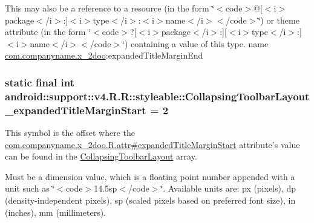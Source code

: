 This may also be a reference to a resource (in the form \char`\"{}$<$code$>$@\mbox{[}$<$i$>$package$<$/i$>$:\mbox{]}$<$i$>$type$<$/i$>$:$<$i$>$name$<$/i$>$$<$/code$>$\char`\"{}) or theme attribute (in the form \char`\"{}$<$code$>$?\mbox{[}$<$i$>$package$<$/i$>$:\mbox{]}\mbox{[}$<$i$>$type$<$/i$>$:\mbox{]}$<$i$>$name$<$/i$>$$<$/code$>$\char`\"{}) containing a value of this type.  name \hyperlink{namespacecom_1_1companyname_1_1x__2doo}{com.companyname.x\_\-2doo}:expandedTitleMarginEnd \hypertarget{classandroid_1_1support_1_1v4_1_1_r_1_1styleable_84d535c1e152dbfcb33c3dda89373800}{
\subsubsection[{CollapsingToolbarLayout\_\-expandedTitleMarginStart}]{\setlength{\rightskip}{0pt plus 5cm}static final int android::support::v4.R.R::styleable::CollapsingToolbarLayout\_\-expandedTitleMarginStart = 2}}
\label{classandroid_1_1support_1_1v4_1_1_r_1_1styleable_84d535c1e152dbfcb33c3dda89373800}


This symbol is the offset where the \hyperlink{classcom_1_1companyname_1_1x__2doo_1_1_r_1_1attr_c3387d729c190f1814da7e38ded19f7f}{com.companyname.x\_\-2doo.R.attr\#expandedTitleMarginStart} attribute's value can be found in the \hyperlink{classandroid_1_1support_1_1v4_1_1_r_1_1styleable_aa101903fcf4b45a3b7fee0a0abc5ea8}{CollapsingToolbarLayout} array.

Must be a dimension value, which is a floating point number appended with a unit such as \char`\"{}$<$code$>$14.5sp$<$/code$>$\char`\"{}. Available units are: px (pixels), dp (density-independent pixels), sp (scaled pixels based on preferred font size), in (inches), mm (millimeters). 


